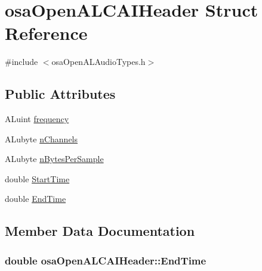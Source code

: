 \hypertarget{structosa_open_a_l_c_a_i_header}{}\section{osa\+Open\+A\+L\+C\+A\+I\+Header Struct Reference}
\label{structosa_open_a_l_c_a_i_header}


{\ttfamily \#include $<$osa\+Open\+A\+L\+Audio\+Types.\+h$>$}

\subsection*{Public Attributes}
\begin{DoxyCompactItemize}
\item 
A\+Luint \hyperlink{structosa_open_a_l_c_a_i_header_aaa90f7109f9686b0b3d1cfe440bb244a}{frequency}
\item 
A\+Lubyte \hyperlink{structosa_open_a_l_c_a_i_header_a244fe6df719466694ffc1ccc593d54d0}{n\+Channels}
\item 
A\+Lubyte \hyperlink{structosa_open_a_l_c_a_i_header_a6856804bf471be06e7f3382088f0815f}{n\+Bytes\+Per\+Sample}
\item 
double \hyperlink{structosa_open_a_l_c_a_i_header_a997c67e3b4e503cd6a374bc26c4151d9}{Start\+Time}
\item 
double \hyperlink{structosa_open_a_l_c_a_i_header_a6b1dc8f15a496e97853553fe619e5708}{End\+Time}
\end{DoxyCompactItemize}


\subsection{Member Data Documentation}
\hypertarget{structosa_open_a_l_c_a_i_header_a6b1dc8f15a496e97853553fe619e5708}{}
\subsubsection[{End\+Time}]{\setlength{\rightskip}{0pt plus 5cm}double osa\+Open\+A\+L\+C\+A\+I\+Header\+::\+End\+Time}\label{structosa_open_a_l_c_a_i_header_a6b1dc8f15a496e97853553fe619e5708}
\hypertarget{structosa_open_a_l_c_a_i_header_aaa90f7109f9686b0b3d1cfe440bb244a}{}
